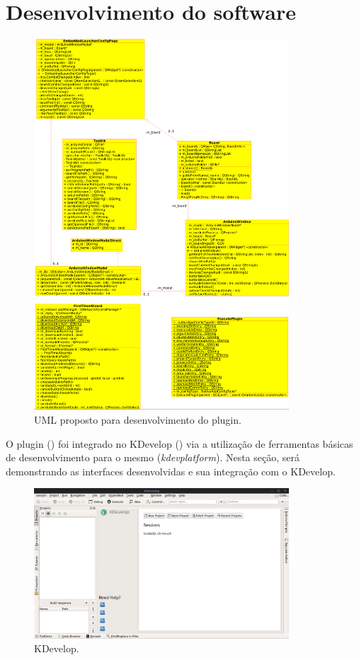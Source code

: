 \section{Desenvolvimento do software}

\begin{figure}[!htb]
  \centering
  \includegraphics[width=0.85\textwidth]{figuras/uml.png}
  \caption[UML proposto]{UML proposto para desenvolvimento do plugin.}
  \label{fig:uml}
\end{figure}


O plugin () foi integrado no KDevelop () via a utilização de ferramentas básicas de desenvolvimento para o mesmo (\textit{kdevplatform}). Nesta seção, será demonstrando as interfaces desenvolvidas e sua integração com o KDevelop.

\begin{figure}[!htb]
  \centering
  \includegraphics[width=0.85\textwidth]{figuras/kdevelop.png}
    \caption[KDevelop]{KDevelop.}
    \label{fig:kdevelop}
\end{figure}

